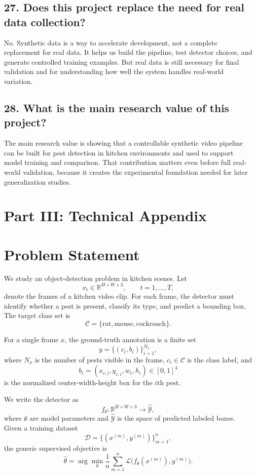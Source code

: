 \documentclass[11pt]{article}
\begin{document}
\subsection*{27. Does this project replace the need for real data collection?}
No. Synthetic data is a way to accelerate development, not a complete replacement for real data. It helps us build the pipeline, test detector choices, and generate controlled training examples. But real data is still necessary for final validation and for understanding how well the system handles real-world variation.

\subsection*{28. What is the main research value of this project?}
The main research value is showing that a controllable synthetic video pipeline can be built for pest detection in kitchen environments and used to support model training and comparison. That contribution matters even before full real-world validation, because it creates the experimental foundation needed for later generalization studies.
\clearpage
\section*{Part III: Technical Appendix}

\section{Problem Statement}
We study an object-detection problem in kitchen scenes. Let
\[
x_t \in \mathbb{R}^{H \times W \times 3}, \qquad t=1,\dots,T,
\]
denote the frames of a kitchen video clip. For each frame, the detector must identify whether a pest is present, classify its type, and predict a bounding box. The target class set is
\[
\mathcal{C}=\{\text{rat}, \text{mouse}, \text{cockroach}\}.
\]

For a single frame $x$, the ground-truth annotation is a finite set
\[
y=\{(c_i,b_i)\}_{i=1}^{N_x},
\]
where $N_x$ is the number of pests visible in the frame, $c_i \in \mathcal{C}$ is the class label, and
\[
b_i=(x_{c,i}, y_{c,i}, w_i, h_i)\in[0,1]^4
\]
is the normalized center-width-height box for the $i$th pest.

We write the detector as
\[
f_\theta : \mathbb{R}^{H \times W \times 3} \to \widehat{\mathcal{Y}},
\]
where $\theta$ are model parameters and $\widehat{\mathcal{Y}}$ is the space of predicted labeled boxes. Given a training dataset
\[
\mathcal{D}=\{(x^{(m)}, y^{(m)})\}_{m=1}^{n},
\]
the generic supervised objective is
\[
\hat{\theta}
=
\arg\min_{\theta}
\frac{1}{n}\sum_{m=1}^{n}
\mathcal{L}\bigl(f_\theta(x^{(m)}), y^{(m)}\bigr).
\]
\end{document}

